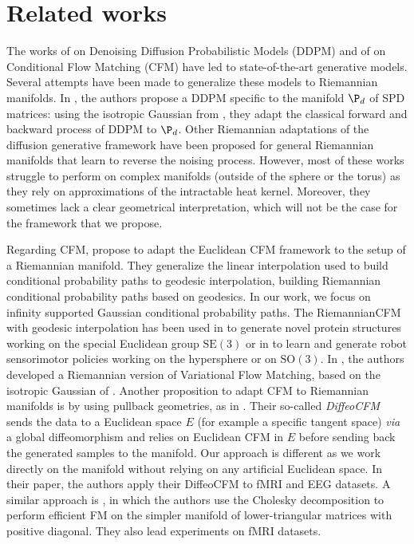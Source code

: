 \documentclass[10pt]{article} %
\theoremstyle{plain}
\theoremstyle{definition}
\theoremstyle{remark}
\begin{document}
\section{Related works}
\label{sec:related_works}
The works of \citet{ho2020denoising, song2021scorebased} on Denoising Diffusion Probabilistic Models (DDPM) and of \citet{lipmanFlowMatchingGenerative2023, liu2022flow, jung2024flowavse} on Conditional Flow Matching (CFM) have led to state-of-the-art generative models. Several attempts have been made to generalize these models to Riemannian manifolds. In \citet{liSPDDDPMDenoisingDiffusion2023}, the authors propose a DDPM specific to the manifold $\P_d$ of SPD matrices: using the isotropic Gaussian from \citet{saidRiemannianGaussianDistributions2016}, they adapt the classical forward and backward process of DDPM to $\P_d$. Other Riemannian adaptations of the diffusion generative framework have been proposed for general Riemannian manifolds \citep{jo2023generative, de2022riemannian, huang2022riemannian} that learn to reverse the noising process. However, most of these works struggle to perform on complex manifolds (outside of the sphere or the torus) as they rely on approximations of the intractable heat kernel. Moreover, they sometimes lack a clear geometrical interpretation, which will not be the case for the framework that we propose.

Regarding CFM, \citet{chen2024flow} propose to adapt the Euclidean CFM framework to the setup of a Riemannian manifold. They generalize the linear interpolation used to build conditional probability paths to geodesic interpolation, building Riemannian conditional probability paths based on geodesics. In our work, we focus on infinity supported Gaussian conditional probability paths. The RiemannianCFM with geodesic interpolation has been used in \citet{boseSE3StochasticFlowMatching2024} to generate novel protein structures working on the special Euclidean group $\text{SE}(3)$ or in \citet{braun2024riemannian} to learn and generate robot sensorimotor policies working on the hypersphere or on $\text{SO}(3)$. In \citet{zaghen2025riemannianvariationalflowmatching}, the authors developed a Riemannian version of Variational Flow Matching, based on the isotropic Gaussian of \citet{saidRiemannianGaussianDistributions2016}. Another proposition to adapt CFM to Riemannian manifolds is by using pullback geometries, as in \citet{collasRiemannianFlowMatching2025}. Their so-called \emph{DiffeoCFM} sends the data to a Euclidean space $E$ (for example a specific tangent space) \emph{via} a global diffeomorphism and relies on Euclidean CFM in $E$ before sending back the generated samples to the manifold. Our approach is different as we work directly on the manifold without relying on any artificial Euclidean space. In their paper, the authors apply their DiffeoCFM to fMRI and EEG datasets. A similar approach is \citet{zhoubrainflow}, in which the authors use the Cholesky decomposition to perform efficient FM on the simpler manifold of lower-triangular matrices with positive diagonal. They also lead experiments on fMRI datasets.
\end{document}
